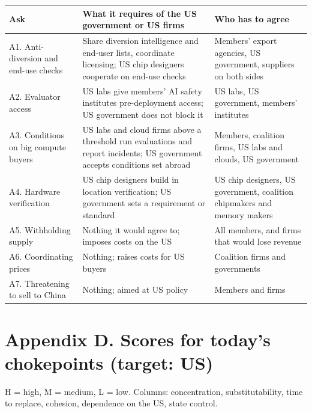 \documentclass[11pt]{article}
\begin{document}
\begin{center}\small
\begin{tabularx}{\linewidth}{@{}>{\raggedright\arraybackslash}p{3.4cm} X X@{}}
\toprule
\textbf{Ask} & \textbf{What it requires of the US government or US firms} & \textbf{Who has to agree}\\
\midrule
A1. Anti-diversion and end-use checks & Share diversion intelligence and end-user lists, coordinate licensing; US chip designers cooperate on end-use checks & Members' export agencies, US government, suppliers on both sides\\
A2. Evaluator access & US labs give members' AI safety institutes pre-deployment access; US government does not block it & US labs, US government, members' institutes\\
A3. Conditions on big compute buyers & US labs and cloud firms above a threshold run evaluations and report incidents; US government accepts conditions set abroad & Members, coalition firms, US labs and clouds, US government\\
A4. Hardware verification & US chip designers build in location verification; US government sets a requirement or standard & US chip designers, US government, coalition chipmakers and memory makers\\
A5. Withholding supply & Nothing it would agree to; imposes costs on the US & All members, and firms that would lose revenue\\
A6. Coordinating prices & Nothing; raises costs for US buyers & Coalition firms and governments\\
A7. Threatening to sell to China & Nothing; aimed at US policy & Members and firms\\
\bottomrule
\end{tabularx}
\end{center}

\clearpage
\section*{Appendix D. Scores for today's chokepoints (target: US)}

H = high, M = medium, L = low. Columns: concentration, substitutability, time to replace, cohesion, dependence on the US, state control.
\end{document}
